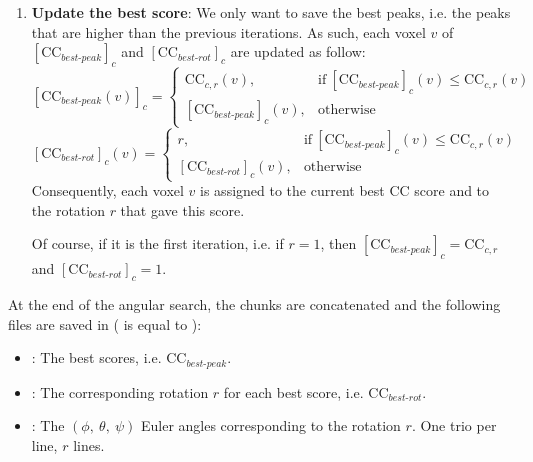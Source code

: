\begin{enumerate}
    \item \textbf{Update the best score}: We only want to save the best peaks, i.e. the peaks that are higher than the previous iterations. As such, each voxel $v$ of ${[\bm{\mathrm{CC}}_{best\text{-}peak}]}_c$ and ${[\bm{\mathrm{CC}}_{best\text{-}rot}]}_c$ are updated as follow:
    \begin{equation}
        {[\bm{\mathrm{CC}}_{best\text{-}peak}(v)]}_c =
            \begin{cases}
                \bm{\mathrm{CC}}_{c,r}(v), & \text{if}\ {[\bm{\mathrm{CC}}_{best\text{-}peak}]}_c(v) \leqslant  \bm{\mathrm{CC}}_{c,r}(v)\\
                {[\bm{\mathrm{CC}}_{best\text{-}peak}]}_c(v), & \text{otherwise}
            \end{cases}
    \end{equation}
    \begin{equation}
        {[\bm{\mathrm{CC}}_{best\text{-}rot}]}_c(v) =
            \begin{cases}
                r, & \text{if}\ {[\bm{\mathrm{CC}}_{best\text{-}peak}]}_c(v) \leqslant \bm{\mathrm{CC}}_{c,r}(v)\\
                {[\bm{\mathrm{CC}}_{best\text{-}rot}]}_c(v), & \text{otherwise}
            \end{cases}
    \end{equation}
    Consequently, each voxel $v$ is assigned to the current best CC score and to the rotation $r$ that gave this score.
    \begin{note}Of course, if it is the first iteration, i.e. if $r=1$, then ${[\bm{\mathrm{CC}}_{best\text{-}peak}]}_c = \bm{\mathrm{CC}}_{c,r}$ and ${[\bm{\mathrm{CC}}_{best\text{-}rot}]}_c = 1$.
    \end{note}
\end{enumerate}
    
At the end of the angular search, the chunks are concatenated and the following files are saved in  ( is equal to ):
\begin{itemize}
    \item {}: The best scores, i.e. $\bm{\mathrm{CC}}_{best\text{-}peak}$.
    \item {}: The corresponding rotation $r$ for each best score, i.e. $\bm{\mathrm{CC}}_{best\text{-}rot}$.
    \item {}: The $(\phi,\ \theta,\ \psi)$ Euler angles corresponding to the rotation $r$. One trio per line, $r$ lines.
\end{itemize}

